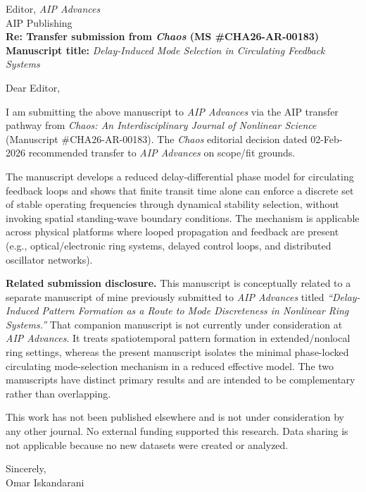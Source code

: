 \documentclass[a4paper,10pt]{letter}
\date{\today}
\begin{document}
    \begin{letter}\noindent Editor, \emph{AIP Advances}\\
    AIP Publishing\\[6pt]

    \noindent\textbf{Re: Transfer submission from \emph{Chaos} (MS \#CHA26-AR-00183)}\\
    \textbf{Manuscript title:} \emph{Delay-Induced Mode Selection in Circulating Feedback Systems}

    \medskip
    \noindent Dear Editor,

    \noindent I am submitting the above manuscript to \emph{AIP Advances} via the AIP transfer pathway from
    \emph{Chaos: An Interdisciplinary Journal of Nonlinear Science} (Manuscript \#CHA26-AR-00183).
    The \emph{Chaos} editorial decision dated 02-Feb-2026 recommended transfer to \emph{AIP Advances} on scope/fit grounds.

    \medskip
    \noindent The manuscript develops a reduced delay-differential phase model for circulating feedback loops and shows that
    finite transit time alone can enforce a discrete set of stable operating frequencies through dynamical stability selection,
    without invoking spatial standing-wave boundary conditions. The mechanism is applicable across physical platforms where
    looped propagation and feedback are present (e.g., optical/electronic ring systems, delayed control loops, and distributed
    oscillator networks).

        \medskip
        \noindent\textbf{Related submission disclosure.}
        This manuscript is conceptually related to a separate manuscript of mine previously submitted to \emph{AIP Advances} titled
        \emph{``Delay-Induced Pattern Formation as a Route to Mode Discreteness in Nonlinear Ring Systems.''}
        That companion manuscript is not currently under consideration at \emph{AIP Advances}.
        It treats spatiotemporal pattern formation in extended/nonlocal ring settings, whereas the present manuscript isolates the minimal
        phase-locked circulating mode-selection mechanism in a reduced effective model. The two manuscripts have distinct primary results
        and are intended to be complementary rather than overlapping.

    \medskip
    \noindent This work has not been published elsewhere and is not under consideration by any other journal.
    No external funding supported this research. Data sharing is not applicable because no new datasets were created or analyzed.

    \medskip
    \noindent Sincerely,\\
    Omar Iskandarani



    \end{letter}
\end{document}
